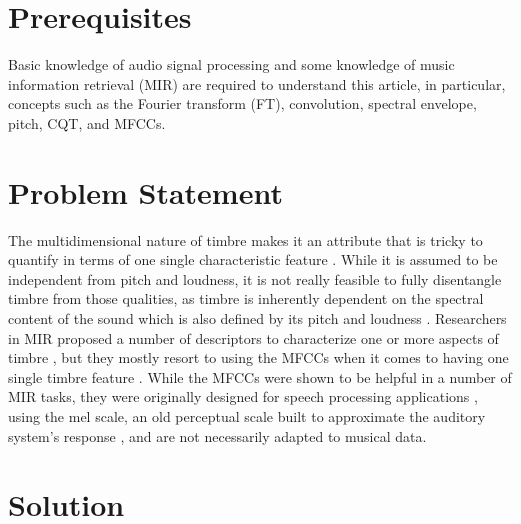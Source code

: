 \documentclass[journal]{IEEEtran}
\begin{document}
\section{Prerequisites}

Basic knowledge of audio signal processing and some knowledge of music information retrieval (MIR) \cite{mueller2007} are required to understand this article, in particular, concepts such as the Fourier transform (FT), convolution, spectral envelope, pitch, CQT, and MFCCs.


\section{Problem Statement}

The multidimensional nature of timbre makes it an attribute that is tricky to quantify in terms of one single characteristic feature \cite{grey1977}. While it is assumed to be independent from pitch and loudness, it is not really feasible to fully disentangle timbre from those qualities, as timbre is inherently dependent on the spectral content of the sound which is also defined by its pitch and loudness \cite{moore2004}. Researchers in MIR proposed a number of descriptors to characterize one or more aspects of timbre \cite{peeters2003}, but they mostly resort to using the MFCCs when it comes to having one single timbre feature \cite{mueller2007}. While the MFCCs were shown to be helpful in a number of MIR tasks, they were originally designed for speech processing applications \cite{davis1980}, using the mel scale, an old perceptual scale built to approximate the auditory system's response \cite{stevens1937}, and are not necessarily adapted to musical data.


%

\cite{engel2017}


\section{Solution}

\end{document}
